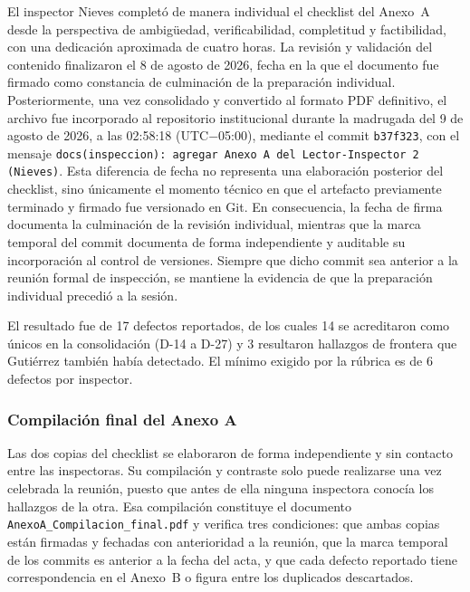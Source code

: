 \documentclass[journal,onecolumn]{IEEEtran}
\begin{document}
	El inspector Nieves completó de manera individual el checklist del
	Anexo~A desde la perspectiva de ambigüedad, verificabilidad, completitud y
	factibilidad, con una dedicación aproximada de cuatro horas. La revisión y
	validación del contenido finalizaron el 8 de agosto de 2026, fecha en la que
	el documento fue firmado como constancia de culminación de la preparación
	individual. Posteriormente, una vez consolidado y convertido al formato PDF
	definitivo, el archivo fue incorporado al repositorio institucional durante
	la madrugada del 9 de agosto de 2026, a las 02:58:18 (UTC$-$05:00),
	mediante el commit \texttt{b37f323}, con el mensaje \texttt{docs(inspeccion):
		agregar Anexo A del Lector-Inspector 2 (Nieves)}. Esta diferencia de fecha no
	representa una elaboración posterior del checklist, sino únicamente el
	momento técnico en que el artefacto previamente terminado y firmado fue
	versionado en Git. En consecuencia, la fecha de firma documenta la
	culminación de la revisión individual, mientras que la marca temporal del
	commit documenta de forma independiente y auditable su incorporación al
	control de versiones. Siempre que dicho commit sea anterior a la reunión
	formal de inspección, se mantiene la evidencia de que la preparación
	individual precedió a la sesión.
	
	El resultado fue de 17 defectos reportados, de los cuales 14 se acreditaron
	como únicos en la consolidación (D-14 a D-27) y 3 resultaron hallazgos de
	frontera que Gutiérrez también había detectado. El mínimo exigido por la
	rúbrica es de 6 defectos por inspector.
	
	\subsubsection{Compilación final del Anexo A}
	
	Las dos copias del checklist se elaboraron de forma independiente y sin
	contacto entre las inspectoras. Su compilación y contraste solo puede
	realizarse una vez celebrada la reunión, puesto que antes de ella ninguna
	inspectora conocía los hallazgos de la otra. Esa compilación constituye el
	documento \texttt{AnexoA\_\allowbreak Compilacion\_\allowbreak final.pdf} y
	verifica tres condiciones: que ambas copias están firmadas y fechadas con
	anterioridad a la reunión, que la marca temporal de los commits es anterior
	a la fecha del acta, y que cada defecto reportado tiene correspondencia en
	el Anexo~B o figura entre los duplicados descartados.
	
\end{document}
